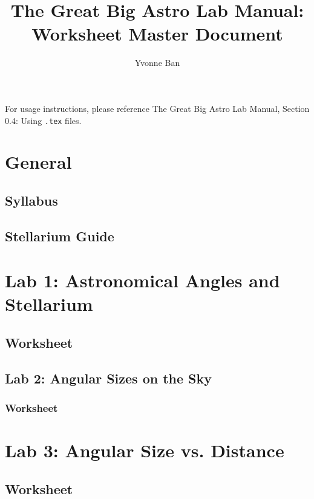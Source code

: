 \documentclass[12pt]{article}
\title{The Great Big Astro Lab Manual:\\Worksheet Master Document}
\author{Yvonne Ban}
\begin{document}
\maketitle

For usage instructions, please reference The Great Big Astro Lab Manual, Section 0.4: Using \texttt{.tex} files.

\section{General}\label{apx:gen}
\newpage

\subsection{Syllabus}\label{apx:gen_syl}

\newpage
\subsection{Stellarium Guide}\label{apx:gen_stel}


\newpage
\section{Lab 1: Astronomical Angles and Stellarium}\label{apx:lab_01}
\subsection{Worksheet}\label{apx:lab_01_ws}


\newpage
\subsection{Lab 2: Angular Sizes on the Sky}\label{apx:lab_02}
\subsubsection{Worksheet}\label{apx:lab_02_ws}
%

\newpage
\section{Lab 3: Angular Size vs. Distance}\label{apx:lab_03}
\subsection{Worksheet}\label{apx:lab_03_ws}

\end{document}
